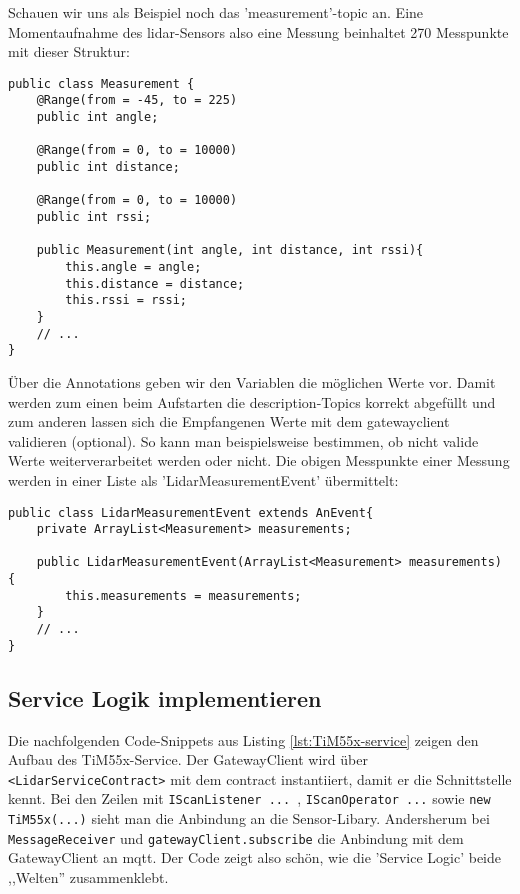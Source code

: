 Schauen wir uns als Beispiel noch das 'measurement'-\Gls{topic} an. Eine Momentaufnahme des \acrshort{lidar}-Sensors also eine Messung beinhaltet 270 Messpunkte mit dieser Struktur:
\begin{lstlisting}[caption={TiM55x-Service - Struktur der Messpunkte},label={lst:lidar_measurement}]
public class Measurement {
    @Range(from = -45, to = 225)
    public int angle;
    
    @Range(from = 0, to = 10000)
    public int distance;
    
    @Range(from = 0, to = 10000)
    public int rssi;

    public Measurement(int angle, int distance, int rssi){
        this.angle = angle;
        this.distance = distance;
        this.rssi = rssi;
    }
    // ...
}
\end{lstlisting}
Über die Annotations geben wir den Variablen die möglichen Werte vor. Damit werden zum einen beim Aufstarten die \Gls{description}-Topics korrekt abgefüllt und zum anderen lassen sich die Empfangenen Werte mit dem \Gls{gatewayclient} validieren (optional). So kann man beispielsweise bestimmen, ob nicht valide Werte weiterverarbeitet werden oder nicht.
Die obigen Messpunkte einer Messung werden in einer Liste als 'LidarMeasurementEvent' übermittelt:
\begin{lstlisting}[caption={TiM55x-Service - Struktur des 'LidarMeasurementEvent'},label={lst:lidar_measurementevent}]
public class LidarMeasurementEvent extends AnEvent{
    private ArrayList<Measurement> measurements;
    
    public LidarMeasurementEvent(ArrayList<Measurement> measurements) {
        this.measurements = measurements;
    }
    // ...
}
\end{lstlisting}

\subsection{Service Logik implementieren}
Die nachfolgenden Code-Snippets aus Listing \ref{lst:TiM55x-service} zeigen den Aufbau des TiM55x-Service. Der GatewayClient wird über \verb|<LidarServiceContract>| mit dem \Gls{contract} instantiiert, damit er die Schnittstelle kennt. Bei den Zeilen mit \verb|IScanListener ... |, \verb|IScanOperator ...| sowie \verb|new TiM55x(...)| sieht man die Anbindung an die Sensor-Libary. Andersherum bei \verb|MessageReceiver| und \verb|gatewayClient.subscribe| die Anbindung mit dem GatewayClient an \acrshort{mqtt}. Der Code zeigt also schön, wie die 'Service Logic' beide ,,Welten'' zusammenklebt.


